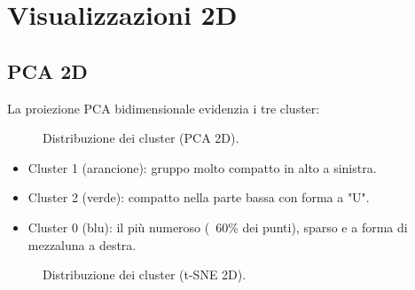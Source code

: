 \documentclass[a4paper,12pt]{article}
\begin{document}
\section{Visualizzazioni 2D}
\subsection{PCA 2D}
La proiezione PCA bidimensionale evidenzia i tre cluster:
\begin{figure}[h!]
  \centering
  \caption{Distribuzione dei cluster (PCA 2D).}
  \label{fig:pca}
\end{figure}
\begin{itemize}
  \item Cluster 1 (arancione): gruppo molto compatto in alto a sinistra.
  \item Cluster 2 (verde): compatto nella parte bassa con forma a "U".
  \item Cluster 0 (blu): il più numeroso (~60\% dei punti), sparso e a forma di mezzaluna a destra.
\end{itemize}

\begin{figure}[h!]
  \centering
  \caption{Distribuzione dei cluster (t-SNE 2D).}
  \label{fig:tsne}
\end{figure}
\end{document}
